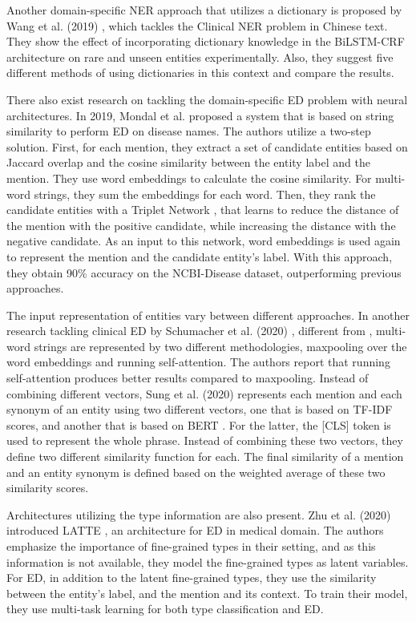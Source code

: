 \documentclass{report}
\theoremstyle{definition}
\theoremstyle{remark}
\begin{document}
Another domain-specific NER approach that utilizes a dictionary is proposed by Wang et al. (2019) \cite{MedDict}, which tackles the Clinical NER problem in Chinese text. They show the effect of incorporating dictionary knowledge in the BiLSTM-CRF \cite{BiLSTMCRF} architecture on rare and unseen entities experimentally. Also, they suggest five different methods of using dictionaries in this context and compare the results. 

There also exist research on tackling the domain-specific ED problem with neural architectures. In 2019, Mondal et al. \cite{MedicalTriplet} proposed a system that is based on string similarity to perform ED on disease names. The authors utilize a two-step solution. First, for each mention, they extract a set of candidate entities based on Jaccard overlap and the cosine similarity between the entity label and the mention. They use word embeddings to calculate the cosine similarity. For multi-word strings, they sum the embeddings for each word. Then, they rank the candidate entities with a Triplet Network \cite{tripletNetwork}, that learns to reduce the distance of the mention with the positive candidate, while increasing the distance with the negative candidate. As an input to this network, word embeddings is used again to represent the mention and the candidate entity's label. With this approach, they obtain 90\% accuracy on the NCBI-Disease \cite{ncbi} dataset, outperforming previous approaches. 

The input representation of entities vary between different approaches. In another research tackling clinical ED by Schumacher et al. (2020) \cite{ClinicalConcept}, different from \cite{MedicalTriplet},  multi-word strings are represented by two different methodologies, maxpooling over the word embeddings and running self-attention. The authors report that running self-attention produces better results compared to maxpooling. Instead of combining different vectors, Sung et al. (2020) \cite{sung-etal} represents each mention and each synonym of an entity using two different vectors, one that is based on TF-IDF scores, and another that is based on BERT \cite{BERT}. For the latter, the [CLS] token is used to represent the whole phrase. Instead of combining these two vectors, they define two different similarity function for each. The final similarity of a mention and an entity synonym is defined based on the weighted average of these two similarity scores.

Architectures utilizing the type information are also present. Zhu et al. (2020) introduced LATTE \cite{latte}, an architecture for ED in medical domain. The authors emphasize the importance of fine-grained types in their setting, and as this information is not available, they model the fine-grained types as latent variables. For ED, in addition to the latent fine-grained types, they use the similarity between the entity's label, and the mention and its context. To train their model, they use multi-task learning for both type classification and ED.
\end{document}
